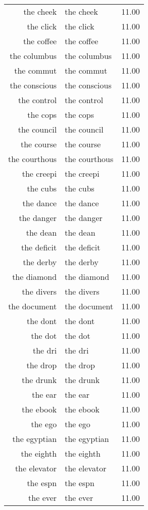 \begin{table}[ht]
\begin{tabular}{rlr}
  the cheek & the cheek & 11.00 \\ 
  the click & the click & 11.00 \\ 
  the coffee & the coffee & 11.00 \\ 
  the columbus & the columbus & 11.00 \\ 
  the commut & the commut & 11.00 \\ 
  the conscious & the conscious & 11.00 \\ 
  the control & the control & 11.00 \\ 
  the cops & the cops & 11.00 \\ 
  the council & the council & 11.00 \\ 
  the course & the course & 11.00 \\ 
  the courthous & the courthous & 11.00 \\ 
  the creepi & the creepi & 11.00 \\ 
  the cubs & the cubs & 11.00 \\ 
  the dance & the dance & 11.00 \\ 
  the danger & the danger & 11.00 \\ 
  the dean & the dean & 11.00 \\ 
  the deficit & the deficit & 11.00 \\ 
  the derby & the derby & 11.00 \\ 
  the diamond & the diamond & 11.00 \\ 
  the divers & the divers & 11.00 \\ 
  the document & the document & 11.00 \\ 
  the dont & the dont & 11.00 \\ 
  the dot & the dot & 11.00 \\ 
  the dri & the dri & 11.00 \\ 
  the drop & the drop & 11.00 \\ 
  the drunk & the drunk & 11.00 \\ 
  the ear & the ear & 11.00 \\ 
  the ebook & the ebook & 11.00 \\ 
  the ego & the ego & 11.00 \\ 
  the egyptian & the egyptian & 11.00 \\ 
  the eighth & the eighth & 11.00 \\ 
  the elevator & the elevator & 11.00 \\ 
  the espn & the espn & 11.00 \\ 
  the ever & the ever & 11.00 \\ 

\end{tabular}
\end{table}
